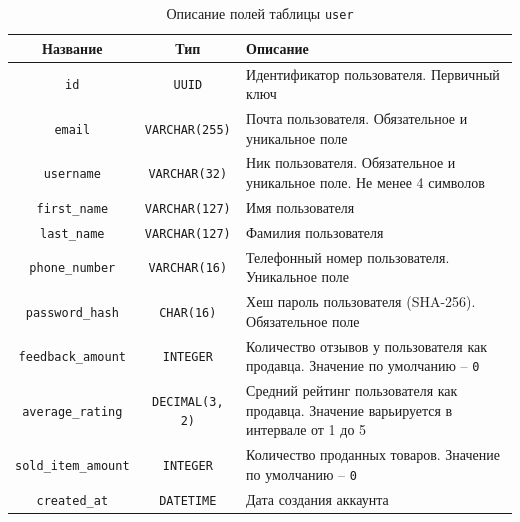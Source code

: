 \documentclass[a4paper,14pt]{extarticle}
\begin{document}
\begin{center}
    \begin{longtable}{|c|c|>{\centering\arraybackslash}m{8cm}|}
        \caption{Описание полей таблицы \texttt{user}}
        \label{tab:user}
        \\
        \hline
        \textbf{Название}           & \textbf{Тип}           & \textbf{Описание}                                                                     \\
        \hline
        \texttt{id}                 & \texttt{UUID}          & Идентификатор пользователя. Первичный ключ                                            \\
        \hline
        \texttt{email}              & \texttt{VARCHAR(255)}  & Почта пользователя. Обязательное и уникальное поле                                    \\
        \hline
        \texttt{username}           & \texttt{VARCHAR(32)}   & Ник пользователя. Обязательное и уникальное поле. Не менее 4 символов                 \\
        \hline
        \texttt{first\_name}        & \texttt{VARCHAR(127)}  & Имя пользователя                                                                      \\
        \hline
        \texttt{last\_name}         & \texttt{VARCHAR(127)}  & Фамилия пользователя                                                                  \\
        \hline
        \texttt{phone\_number}      & \texttt{VARCHAR(16)}   & Телефонный номер пользователя. Уникальное поле                                        \\
        \hline
        \texttt{password\_hash}     & \texttt{CHAR(16)}      & Хеш пароль пользователя (SHA-256). Обязательное поле                                  \\
        \hline
        \texttt{feedback\_amount}   & \texttt{INTEGER}       & Количество отзывов у пользователя как продавца. Значение по умолчанию -- \texttt{0}   \\
        \hline
        \texttt{average\_rating}    & \texttt{DECIMAL(3, 2)} & Средний рейтинг пользователя как продавца. Значение варьируется в интервале от 1 до 5 \\
        \hline
        \texttt{sold\_item\_amount} & \texttt{INTEGER}       & Количество проданных товаров. Значение по умолчанию -- \texttt{0}                     \\
        \hline
        \texttt{created\_at}        & \texttt{DATETIME}      & Дата создания аккаунта                                                                \\
        \hline
    \end{longtable}
\end{center}
\end{document}
